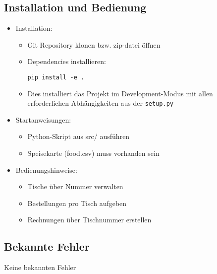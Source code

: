 \documentclass[a4paper,11pt]{article}
\begin{document}
\subsection{Installation und Bedienung}
\begin{itemize}
    \item Installation:
\begin{itemize}
\item Git Repository klonen bzw. zip-datei öffnen
\item Dependencies installieren:
\begin{verbatim}
pip install -e .
\end{verbatim}
\item Dies installiert das Projekt im Development-Modus mit allen erforderlichen Abhängigkeiten aus der \texttt{setup.py}
\end{itemize}
    \item Startanweisungen:
    \begin{itemize}
        \item Python-Skript aus src/ ausführen
        \item Speisekarte (food.csv) muss vorhanden sein
    \end{itemize}
    \item Bedienungshinweise:
    \begin{itemize}
        \item Tische über Nummer verwalten
        \item Bestellungen pro Tisch aufgeben
        \item Rechnungen über Tischnummer erstellen
    \end{itemize}
\end{itemize}

\subsection{Bekannte Fehler}
Keine bekannten Fehler
\end{document}
